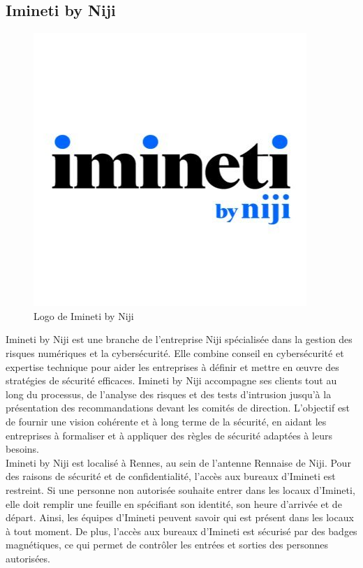 \documentclass[12pt]{article}
\begin{document}
\subsection{Imineti by Niji}
\begin{figure}
    \centering
    \includegraphics[width=0.75\linewidth]{img/imineti.jpg} 
    \caption{Logo de Imineti by Niji}
    \label{fig:wrapfig}
\end{figure}
Imineti by Niji est une branche de l'entreprise Niji spécialisée dans la gestion des risques numériques et la cybersécurité. Elle combine conseil en cybersécurité et expertise technique pour aider les entreprises à définir et mettre en œuvre des stratégies de sécurité efficaces. Imineti by Niji accompagne ses clients tout au long du processus, de l'analyse des risques et des tests d'intrusion jusqu'à la présentation des recommandations devant les comités de direction. L'objectif est de fournir une vision cohérente et à long terme de la sécurité, en aidant les entreprises à formaliser et à appliquer des règles de sécurité adaptées à leurs besoins.
\\
Imineti by Niji est localisé à Rennes, au sein de l'antenne Rennaise de Niji. Pour des raisons de sécurité et de confidentialité, l'accès aux bureaux d'Imineti est restreint. Si une personne non autorisée souhaite entrer dans les locaux d'Imineti, elle doit remplir une feuille en spécifiant son identité, son heure d'arrivée et de départ. Ainsi, les équipes d'Imineti peuvent savoir qui est présent dans les locaux à tout moment. De plus, l'accès aux bureaux d'Imineti est sécurisé par des badges magnétiques, ce qui permet de contrôler les entrées et sorties des personnes autorisées.
\end{document}
